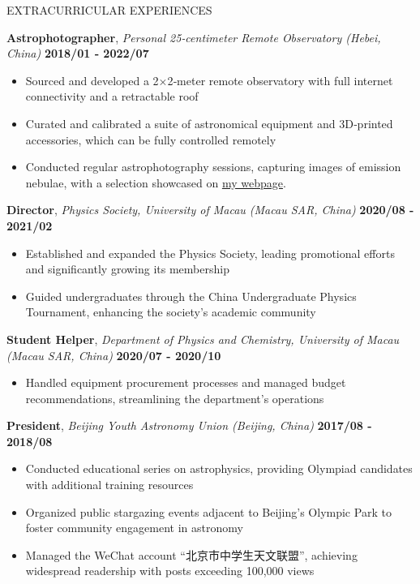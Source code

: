 \documentclass[10pt]{article} %
\begin{document}
\begin{section}{EXTRACURRICULAR EXPERIENCES}
    
\textbf{Astrophotographer}, \textit{Personal 25‑centimeter Remote Observatory (Hebei, China)} \hfill \textbf{2018/01 ‑ 2022/07}
\begin{itemize}[leftmargin=1.5em]
    \item Sourced and developed a 2×2‑meter remote observatory with full internet connectivity and a retractable roof
    \item Curated and calibrated a suite of astronomical equipment and 3D‑printed accessories, which can be fully controlled remotely
    \item Conducted regular astrophotography sessions, capturing images of emission nebulae, with a selection showcased on \href{https://yliu.fit/astrophotography/}{my webpage}.
\end{itemize}

\textbf{Director}, \textit{Physics Society, University of Macau (Macau SAR, China)} \hfill \textbf{2020/08 - 2021/02} 
\begin{itemize}[leftmargin=1.5em]
    \item Established and expanded the Physics Society, leading promotional efforts and significantly growing its membership
    \item Guided undergraduates through the China Undergraduate Physics Tournament, enhancing the society's academic community
\end{itemize}

\textbf{Student Helper}, \textit{Department of Physics and Chemistry, University of Macau (Macau SAR, China)} \hfill \textbf{2020/07 - 2020/10} 
\begin{itemize}[leftmargin=1.5em]
    \item Handled equipment procurement processes and managed budget recommendations, streamlining the department's operations
\end{itemize}

\textbf{President}, \textit{Beijing Youth Astronomy Union (Beijing, China)} \hfill \textbf{2017/08 - 2018/08} 
\begin{itemize}[leftmargin=1.5em]
    \item Conducted educational series on astrophysics, providing Olympiad candidates with additional training resources
    \item Organized public stargazing events adjacent to Beijing’s Olympic Park to foster community engagement in astronomy
    \item Managed the WeChat account ``北京市中学生天文联盟'', achieving widespread readership with posts exceeding 100,000 views
\end{itemize}


\end{section}
\end{document}
